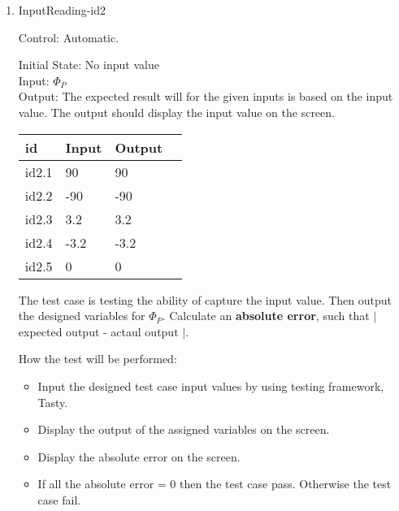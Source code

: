 \documentclass[12pt, titlepage]{article}
\begin{document}
\begin{enumerate}
\item{InputReading-id2\\} 

Control: Automatic. 

Initial State: No input value\\
Input: $\Phi_P$   \\



Output: The expected result will for the given inputs is based on the input value.
The output should display the input value on the screen.


\noindent \begin{tabular}{l l l l} 
    \toprule		
    \textbf{id} & \textbf{Input} & \textbf{Output}\\ 
	\midrule
   id2.1 &  90  & 90\\
   id2.2 & -90  & -90\\
   id2.3 & 3.2  & 3.2\\
   id2.4 & -3.2  & -3.2\\
   id2.5 & 0  & 0\\
    \bottomrule
  \end{tabular}

  
The test case is testing the ability of capture the input value. Then output the designed variables for  $\Phi_P$. Calculate an \textbf{absolute error}, such that $|$ expected output - actaul output $|$.

 


How the test will be performed:

\begin{itemize} 
\item Input the designed test case input values by using testing framework, Tasty. 
\item Display the output of the assigned variables on the screen.
\item  Display the absolute error on the screen.
\item  If all the absolute error = 0 then the test case pass. Otherwise the test case fail.
\end{itemize}


\end{enumerate}
\end{document}

